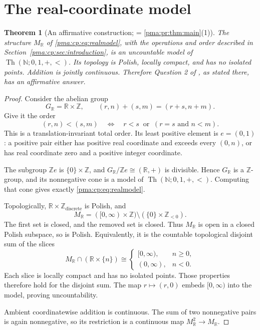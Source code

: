 \documentclass[11pt]{article}
\numberwithin{equation}{section}
\newtheorem{theorem}{Theorem}[section]
\theoremstyle{definition}
\theoremstyle{remark}
\newcommand{\N}{\mathbb N}
\newcommand{\Z}{\mathbb Z}
\newcommand{\R}{\mathbb R}
\newcommand{\Th}{\operatorname{Th}}
\begin{document}
\section{The real-coordinate model}
\label{pma:cp:sec:real}

\begin{theorem}[An affirmative construction; = \cref{pma:pr:thm:main}(1)]
\label{pma:cp:thm:real}
The structure $M_{\R}$ of \eqref{pma:cp:eq:realmodel}, with the operations and
order described in Section~\ref{pma:cp:sec:introduction}, is an uncountable model
of $\Th(\N;0,1,+,<)$. Its topology is Polish, locally compact, and has no isolated
points. Addition is jointly continuous. Therefore Question 2 of
\cite{Glazer}, as stated there, has an affirmative answer.
\end{theorem}

\begin{proof}
Consider the abelian group
\[
G_{\R}=\R\times\Z,
\qquad (r,n)+(s,m)=(r+s,n+m).
\]
Give it the order
\begin{equation}
\label{pma:cp:eq:lexreal}
(r,n)<(s,m)\quad\Longleftrightarrow\quad
r<s\ \text{ or }\ (r=s\text{ and }n<m).
\end{equation}
This is a translation-invariant total order. Its least positive element is
$e=(0,1)$: a positive pair either has positive real coordinate and exceeds
every $(0,n)$, or has real coordinate zero and a positive integer coordinate.

The subgroup $\Z e$ is $\{0\}\times\Z$, and
$G_{\R}/\Z e\cong(\R,+)$ is divisible. Hence $G_{\R}$ is a $\Z$-group,
and its nonnegative cone is a model of $\Th(\N;0,1,+,<)$. Computing that cone gives
exactly \eqref{pma:cp:eq:realmodel}.

Topologically, $\R\times\Z_{\mathrm{discrete}}$ is Polish, and
\begin{equation}
\label{pma:cp:eq:localclosed}
M_{\R}=([0,\infty)\times\Z)
\setminus(\{0\}\times\Z_{<0}).
\end{equation}
The first set is closed, and the removed set is closed. Thus $M_{\R}$ is
open in a closed Polish subspace, so is Polish. Equivalently, it is the
countable topological disjoint sum of the slices
\[
M_{\R}\cap(\R\times\{n\})\cong
\begin{cases}
[0,\infty),&n\geq0,\\
(0,\infty),&n<0.
\end{cases}
\]
Each slice is locally compact and has no isolated points. Those properties
therefore hold for the disjoint sum. The map $r\mapsto(r,0)$ embeds
$[0,\infty)$ into the model, proving uncountability.

Ambient coordinatewise addition is continuous. The sum of two nonnegative
pairs is again nonnegative, so its restriction is a continuous map
$M_{\R}^2\to M_{\R}$.
\end{proof}
\end{document}
